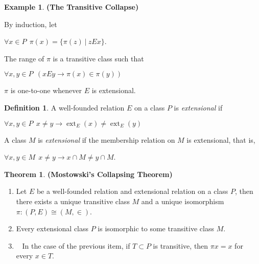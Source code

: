 \documentclass[8pt]{article}
\theoremstyle{definition}
\newtheorem{definition}{Definition}[section]
\theoremstyle{definition}
\newtheorem{theorem}{Theorem}[section]
\theoremstyle{definition}
\theoremstyle{definition}
\theoremstyle{definition}
\theoremstyle{definition}
\theoremstyle{definition}
\theoremstyle{definition}
\theoremstyle{definition}
\theoremstyle{definition}
\theoremstyle{definition}
\theoremstyle{definition}
\newtheorem{example}{Example}[section]
\theoremstyle{definition}
\theoremstyle{definition}
\theoremstyle{question}
\begin{document}
\begin{example} {\bf (The Transitive Collapse)}

  By induction, let
  \begin{center}
    $\forall x \in P \:\: \pi(x) = \{ \pi(z) \: | \: z E x \}$.
  \end{center}

  The range of $\pi$ is a transitive class such that
  \begin{center}
    $\forall x, y \in P \:\: (x E y \to \pi(x) \in \pi(y))$
  \end{center}
\end{example}

$\pi$ is one-to-one whenever $E$ is extensional.

\begin{definition}
  A well-founded relation $E$ on a class $P$ is \emph{extensional} if
  \begin{center}
    $\forall x, y \in P \:\: x \neq y \to \operatorname{ext}_E(x) \neq \operatorname{ext}_E(y)$
  \end{center}
\end{definition}
A class $M$ is \emph{extensional} if the membership relation on $M$ is extensional, that is,
\begin{center}
  $\forall x, y \in M \:\: x \neq y \to x \cap M \neq y \cap M$.
\end{center}

\begin{theorem} {\bf (Mostowski's Collapsing Theorem)}

  \begin{enumerate}
    \item Let $E$ be a well-founded relation and extensional relation on a class $P$, then
    there exists a unique transitive class $M$ and a unique isomorphism $\pi : (P, E) \cong (M, \in)$.
    \item Every extensional class $P$ is isomorphic to some transitive class $M$.
    \item~\label{most:iii} In the case of the previous item, if $T \subset P$ is transitive, 
    then $\pi x = x$ for every $x \in T$.
  \end{enumerate}
\end{theorem}
\end{document}
